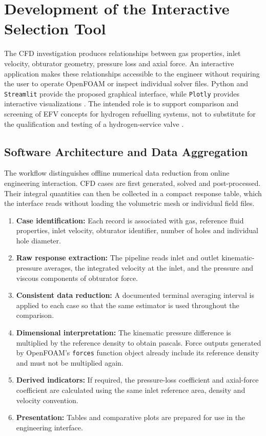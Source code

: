 \chapter{Development of the Interactive Selection Tool}
\label{ch:selection_tool}

The CFD investigation produces relationships between gas properties, inlet velocity, obturator geometry, pressure loss and axial force. An interactive application makes these relationships accessible to the engineer without requiring the user to operate OpenFOAM or inspect individual solver files. Python and \texttt{Streamlit} provide the proposed graphical interface, while \texttt{Plotly} provides interactive visualizations \cite{streamlit_docs,plotly_docs}. The intended role is to support comparison and screening of EFV concepts for hydrogen refuelling systems, not to substitute for the qualification and testing of a hydrogen-service valve \cite{iso19880_3}.

\section{Software Architecture and Data Aggregation}
\label{sec:software_architecture}

The workflow distinguishes offline numerical data reduction from online engineering interaction. CFD cases are first generated, solved and post-processed. Their integral quantities can then be collected in a compact response table, which the interface reads without loading the volumetric mesh or individual field files.

\begin{enumerate}
\item \textbf{Case identification:} Each record is associated with gas, reference fluid properties, inlet velocity, obturator identifier, number of holes and individual hole diameter.
\item \textbf{Raw response extraction:} The pipeline reads inlet and outlet kinematic-pressure averages, the integrated velocity at the inlet, and the pressure and viscous components of obturator force.
\item \textbf{Consistent data reduction:} A documented terminal averaging interval is applied to each case so that the same estimator is used throughout the comparison.
\item \textbf{Dimensional interpretation:} The kinematic pressure difference is multiplied by the reference density to obtain pascals. Force outputs generated by OpenFOAM's \texttt{forces} function object already include its reference density and must not be multiplied again.
\item \textbf{Derived indicators:} If required, the pressure-loss coefficient and axial-force coefficient are calculated using the same inlet reference area, density and velocity convention.
\item \textbf{Presentation:} Tables and comparative plots are prepared for use in the engineering interface.
\end{enumerate}

